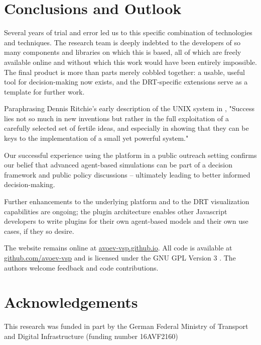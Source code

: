 \documentclass[3p,times,procedia]{elsarticle}
\begin{document}
\section{Conclusions and Outlook}
\label{conclusions}

Several years of trial and error led us to this specific combination of technologies and techniques. The research team is deeply indebted to the developers of so many components and libraries on which this is based, all of which are freely available online and without which this work would have been entirely impossible. The final product is more than parts merely cobbled together: a usable, useful tool for decision-making now exists, and the DRT-specific extensions serve as a template for further work.

Paraphrasing Dennis Ritchie's early description of the UNIX system in \citet{Ritchie1978}, "Success lies not so much in new inventions but rather in the full exploitation of a carefully selected set of fertile ideas, and especially in showing that they can be keys to the implementation of a small yet powerful system."

Our successful experience using the platform in a public outreach setting confirms our belief that advanced agent-based simulations can be part of a decision framework and public policy discussions -- ultimately leading to better informed decision-making.

Further enhancements to the underlying platform and to the DRT visualization capabilities are ongoing; the plugin architecture enables other Javascript developers to write plugins for their own agent-based models and their own use cases, if they so desire.

The website remains online at \href{https://avoev-vsp.github.io}{avoev-vsp.github.io}. All code is available at \href{https://github.com/avoev-vsp/avoev-vsp.github.io}{github.com/avoev-vsp} and is licensed under the GNU GPL Version 3 \cite{FSF2007GnuGPL}. The authors welcome feedback and code contributions.

\section{Acknowledgements}
This research was funded in part by the German Federal Ministry of Transport and Digital Infrastructure (funding number 16AVF2160)






\end{document}
